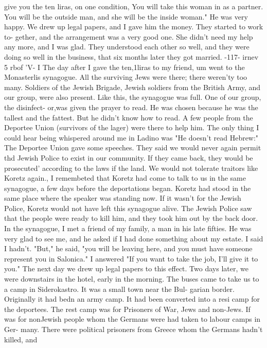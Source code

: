 give you the ten liras, on one condition, You will take this woman in as a partner. 
You will be the outside man, and she will be the inside woman." He was very happy. 
We drew up legal papers, and I gave him the money. They started to work to-
gether, and the arrangement was a very good one. She didn't need my help any more, 
and I was glad. They understood each other so well, and they were doing so well in 
the business, that six months later they got married. 
-117- 
irnev 5 rbof 'V- I 
The day after I gave the ten,1liras to my friend, um went to the Monasterlis 
synagogue. All the surviving Jews were there; there weren'ty too many. Soldiers 
of the Jewish Brigade, Jewish soldiers from the British Army, and our group, were 
also present. Like this, the synagogue was full. One of our group, the disinfect-
or,was given the prayer to read. He was chosen because he was the tallest and the 
fattest. But he didn't know how to read. A few people from the Deportee Union 
(survivors of the lager) were there to help him. The only thing I could hear being 
whispered around me in Ladino was "He doesn't read Hebrew:" 
The Deportee Union gave some speeches. They said we would never again permit thd 
Jewish Police to exist in our community. If they came back, they would be prosecuted' 
according to the laws if the land. We would not tolerate traitors like Koretz again., 
I remembeted that Koretz had come to talk to us in the same synagogue, a few days 
before the deportations began. Koretz had stood in the same place where the speaker 
was standing now. If it wasn't for the Jewish Police, Koretz would not have left 
this synagogue alive. The Jewish Police saw that the people were ready to kill him, 
and they took him out by the back door. 
In the synagogue, I met a friend of my family, a man in his late fifties. He 
was very glad to see me, and he asked if I had done something about my estate. I 
said I hadn't. "But," he said, "you will be leaving here, and you must have someone 
represent you in Salonica." I answered "If you want to take the job, I'll give it 
to you." The next day we drew up legal papers to this effect. 
Two days later, we were downstairs in the hotel, early in the morning. The 
buses came to take us to a camp in Siderokastro. It was a small town near the Bul-
garian border. Originally it had bedn an army camp. It had been converted into a resi 
camp for the deportees. The rest camp was for Prisoners of War, Jews and non-Jews. 
If was for nonJewish people whom the Germans were had taken to labour camps in Ger-
many. There were political prisoners from Greece whom the Germans hadn't killed, and 
